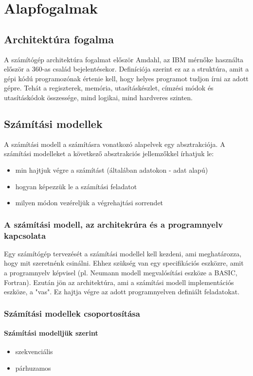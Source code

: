 
\chapter{Alapfogalmak}

\section{Architektúra fogalma}
A számítógép architektúra fogalmat először Amdahl, az IBM mérnőke használta először a 360-as család bejelentésekor.
Definíciója szerint ez az a struktúra, amit a gépi kódú programozónak értenie kell, hogy helyes programot tudjon írni az adott gépre.
Tehát a regiszterek, memória, utasításkészlet, címzési módok és utasításkódok összessége, mind logikai, mind hardveres szinten.

\section{Számítási modellek}
A számítási modell a számításra vonatkozó alapelvek egy absztrakciója.
A számítási modelleket a következő absztrakciós jellemzőkkel írhatjuk le:
\begin{itemize}
    \item min hajtjuk végre a számítást (általában adatokon - adat alapú)
    \item hogyan képezzük le a számítási feladatot
    \item milyen módon vezéreljük a végrehajtási sorrendet
\end{itemize}

\subsection{A számítási modell, az architekrúra és a programnyelv kapcsolata}
Egy számítógép tervezését a számítási modellel kell kezdeni, ami meghatározza, hogy mit szeretnénk csinálni.
Ehhez szükség van egy specifikációs eszközre, amit a programnyelv képvisel (pl. Neumann modell megvalósítási eszköze a BASIC, Fortran).
Ezután jön az architektúra, ami a számítási modell implementációs eszköze, a "vas".
Ez hajtja végre az adott programnyelven definiált feladatokat.

\subsection{Számítási modellek csoportosítása}
\subsubsection{Számítási modelljük szerint}
\begin{itemize}
    \item szekvenciális
    \item párhuzamos
\end{itemize}

